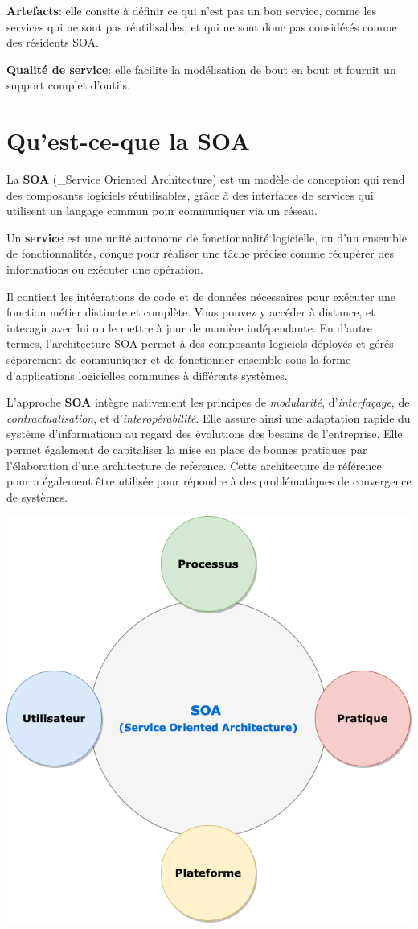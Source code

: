 \documentclass[
]{book}
\theoremstyle{definition}
\theoremstyle{definition}
\theoremstyle{definition}
\theoremstyle{definition}
\theoremstyle{remark}
\begin{document}
\textbf{Artefacts}: elle consite à définir ce qui n'est pas un bon service, comme les services qui ne sont pas réutilisables, et qui ne sont donc pas considérés comme des résidents SOA.

\textbf{Qualité de service}: elle facilite la modélisation de bout en bout et fournit un support complet d'outils.

\hypertarget{quest-ce-que-la-soa}{%
\section{Qu'est-ce-que la SOA}\label{quest-ce-que-la-soa}}

La \textbf{SOA} (\_Service Oriented Architecture) est un modèle de conception qui rend des composants logiciels réutilisables, grâce à des interfaces de services qui utilisent un langage commun pour communiquer via un réseau.

Un \textbf{service} est une unité autonome de fonctionnalité logicielle, ou d'un ensemble de fonctionnalités, conçue pour réaliser une tâche précise comme récupérer des informations ou exécuter une opération.

Il contient les intégrations de code et de données nécessaires pour exécuter une fonction métier distincte et complète. Vous pouvez y accéder à distance, et interagir avec lui ou le mettre à jour de manière indépendante. En d'autre termes, l'architecture SOA permet à des composants logiciels déployés et gérés séparement de communiquer et de fonctionner ensemble sous la forme d'applications logicielles communes à différents systèmes.

L'approche \textbf{SOA} intègre nativement les principes de \emph{modularité}, d'\emph{interfaçage}, de \emph{contractualisation}, et d'\emph{interopérabilité}. Elle assure ainsi une adaptation rapide du système d'informationn au regard des évolutions des besoins de l'entreprise. Elle permet également de capitaliser la mise en place de bonnes pratiques par l'élaboration d'une architecture de reference. Cette architecture de référence pourra également être utilisée pour répondre à des problématiques de convergence de systèmes.

\begin{center}\includegraphics[width=0.7\linewidth]{SOA} \end{center}
\end{document}

